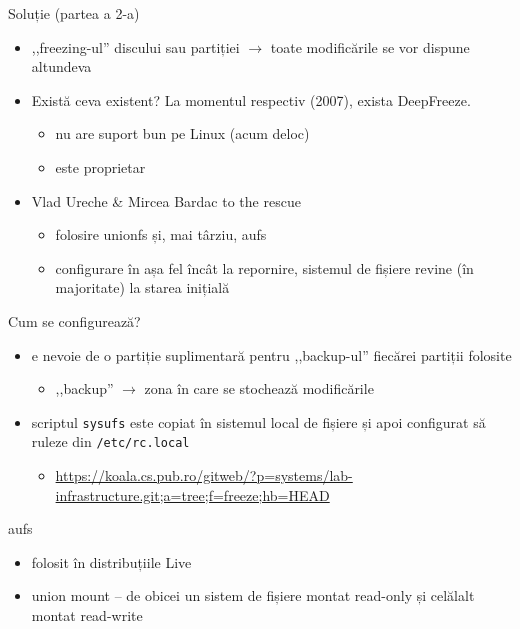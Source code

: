 \documentclass{beamer}
\begin{document}
\begin{frame}{Soluție (partea a 2-a)}
  \begin{itemize}
    \item ,,freezing-ul'' discului sau partiției $\rightarrow$ toate
      modificările se vor dispune altundeva
    \item Există ceva existent? La momentul respectiv (2007), exista
      DeepFreeze.
      \begin{itemize}
        \item nu are suport bun pe Linux (acum deloc)
        \item este proprietar
      \end{itemize}
    \item Vlad Ureche \& Mircea Bardac to the rescue
      \begin{itemize}
        \item folosire unionfs și, mai târziu, aufs
        \item configurare în așa fel încât la repornire, sistemul de fișiere
          revine (în majoritate) la starea inițială
      \end{itemize}
  \end{itemize}
\end{frame}

\begin{frame}{Cum se configurează?}
  \begin{itemize}
    \item e nevoie de o partiție suplimentară pentru ,,backup-ul'' fiecărei
      partiții folosite
      \begin{itemize}
        \item ,,backup'' $\rightarrow$ zona în care se stochează modificările
      \end{itemize}
    \item scriptul \texttt{sysufs} este copiat în sistemul local de fișiere și
      apoi configurat să ruleze din \texttt{/etc/rc.local}
      \begin{itemize}
        \item \url{https://koala.cs.pub.ro/gitweb/?p=systems/lab-infrastructure.git;a=tree;f=freeze;hb=HEAD}
      \end{itemize}
  \end{itemize}
\end{frame}

\begin{frame}{aufs}
  \begin{itemize}
    \item folosit în distribuțiile Live
    \item union mount -- de obicei un sistem de fișiere montat read-only
      și celălalt montat read-write
  \end{itemize}
\end{frame}
\end{document}

